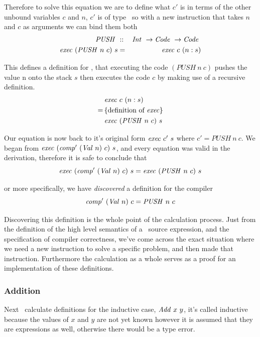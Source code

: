 \documentclass {article}
\begin{document}
Therefore to solve this equation we are to
define what $c'$ is in terms of 
the other unbound variables $c$ and $n$,
$c'$ is of  type \code\ 
so with a new instruction that takes $n$
and $c$ as arguments we can bind them both\cite[bottom of page 9]{bandh}
\newcommand{\PUSHt}{\textit{PUSH}}
\newcommand{\PUSH}{\mathit{PUSH\ }}
\begin{eqnarray}
\PUSH &::& \Int \rightarrow \Code \rightarrow \Code \nonumber \\
\Exec (\PUSH n\ c)\ s &=& \Exec c\ (n :s) \label{execpush}
\end{eqnarray}

This defines a definition for \exec, 
that executing the code \( (\PUSH n\ c) \) 
pushes the value n onto the stack $s$
then executes the code $c$ by making use of 
a recursive definition.
\begin{align*}
&\Exec c\ (n:s) \\
=\, & \{\mbox{definition of \exec}\} \\
&\Exec  (\PUSH n\ c)\ s
\end{align*}

Our equation is now back to it's original form $\mathit{exec\ } c'\ s$
where $c' = \PUSH n\ c$. We began from 
\(\Exec (\Compp (\Val n)\ c)\ s \),
and every equation was valid in the derivation,
therefore it is safe to conclude that 
\begin{equation*}
\Exec (\Compp (\Val  n)\ c)\ s = \Exec  (\PUSH n\ c)\ s 
\end{equation*}

\noindent or more specifically, we have \emph{discovered} 
a definition for the compiler
\begin{equation}
\Compp  (\Val n)\ c =  \PUSH n\ c \label{compval}
\end{equation}

Discovering this definition is the 
whole point of the calculation process.
Just from the definition of the high level semantics 
of a \val\ source expression, and the specification 
of compiler correctness, we've come across the
exact situation where we need a new instruction
to solve a specific problem,
and then made that instruction. 
Furthermore the calculation as a whole
serves as a proof for an implementation
of these definitions.

\subsubsection{Addition} \label{addsec}

Next \BH\ calculate definitions for the inductive case, 
$\mathit{Add\ } x\ y$,
it's called inductive because  
the values of $x$ and $y$ are not yet known
however it is assumed
that they are expressions as well,
otherwise there would be a type error.
\end{document}
